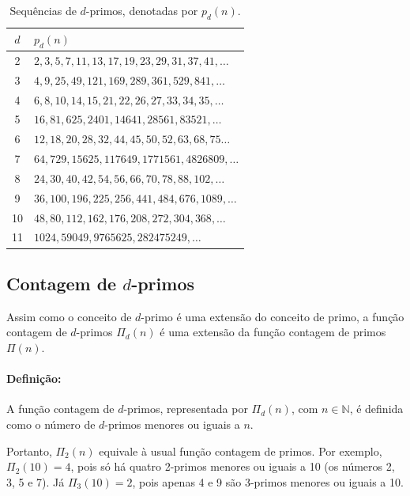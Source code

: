 \documentclass[12pt,a4paper,fleqn]{report}
\begin{document}
\begin{table}[ht]
\begin{center}
\caption{Sequências de $d$-primos, denotadas por $p_d(n)$.}

\vskip 1cm
\begin{tabular}{|c|l|} \hline
        $d$ & $p_d(n)$ \\
        \hline
        2 & $2, 3, 5, 7, 11, 13, 17, 19, 23, 29, 31, 37, 41, \ldots$ \\
        3 & $4, 9, 25, 49, 121, 169, 289, 361, 529, 841, \ldots$ \\
        4 & $6, 8, 10, 14, 15, 21, 22, 26, 27, 33, 34, 35, \ldots$ \\
        5 & $16, 81, 625, 2401, 14641, 28561, 83521, \ldots$ \\
        6 & $12, 18, 20, 28, 32, 44, 45, 50, 52, 63, 68, 75 \ldots$ \\
        7 & $64, 729, 15625, 117649, 1771561, 4826809, \ldots$ \\
        8 & $24, 30, 40, 42, 54, 56, 66, 70, 78, 88, 102, \ldots$ \\
        9 & $36, 100, 196, 225, 256, 441, 484, 676, 1089, \ldots$ \\
        10 & $48, 80, 112, 162, 176, 208, 272, 304, 368, \ldots$ \\
        11 & $ 1024, 59049, 9765625, 282475249, \ldots$ \\
        \hline
    \end{tabular}
    \label{tab:n-primes}
\end{center}
\end{table}

\subsection*{Contagem de $d$-primos}

Assim como o conceito de $d$-primo é uma extensão do conceito de primo, a função 
contagem de $d$-primos $\Pi_d(n)$ é uma extensão da  função contagem de primos $\Pi(n)$.

\paragraph*{Definição:} A função  contagem de $d$-primos, representada por
$\Pi_d(n)$, com $n\in \mathbb{N}$, é definida como o número de $d$-primos
menores ou iguais a $n$.

Portanto, $\Pi_2(n)$ equivale à usual função  contagem de primos. Por exemplo, $\Pi_2(10) = 4$, pois só há quatro 2-primos menores ou
iguais a 10 (os números 2, 3, 5 e 7). Já $\Pi_3(10) = 2$, pois apenas 4 e 9 são 3-primos menores ou iguais a 10.
\end{document}
